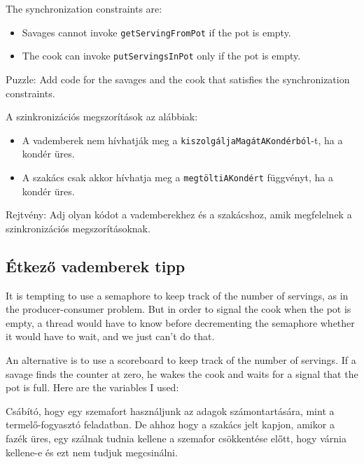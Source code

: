 \documentclass{book}
\newcommand{\clearemptydoublepage}{\newpage\cleardoublepage}
\begin{document}
The synchronization constraints are:

\begin{itemize}

\item Savages cannot invoke {\tt getServingFromPot} if the
pot is empty.

\item The cook can invoke {\tt putServingsInPot} only if
the pot is empty.

\end{itemize}

Puzzle: Add code for the savages and the cook that
satisfies the synchronization constraints.

A szinkronizációs megszorítások az alábbiak:

\begin{itemize}

\item A vademberek nem hívhatják meg a {\tt kiszolgáljaMagátAKondérból}-t, ha a kondér üres.
\item A szakács csak akkor hívhatja meg a {\tt megtöltiAKondért} függvényt, ha a kondér üres.

\end{itemize}

Rejtvény: Adj olyan kódot a vademberekhez és a szakácshoz,
amik megfelelnek a szinkronizációs megszorításoknak.

\clearemptydoublepage
\subsection{Étkező vademberek tipp}

It is tempting to use a semaphore to keep track of the number of
servings, as in the producer-consumer problem.  But in order to signal
the cook when the pot is empty, a thread would have to know before
decrementing the semaphore whether it would have to wait, and we just
can't do that.

An alternative is to use a scoreboard to
keep track of the number of servings.  If a savage finds
the counter at zero, he wakes the cook and waits for a signal
that the pot is full.  Here are the variables I used:

Csábító, hogy egy szemafort használjunk az adagok számontartására,
mint a termelő-fogyasztó feladatban. De ahhoz hogy
a szakács  jelt kapjon, amikor a fazék üres, egy szálnak tudnia kellene
a szemafor csökkentése előtt, hogy várnia kellene-e és ezt
nem tudjuk megcsinálni.
\end{document}
